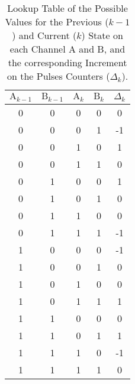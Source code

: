 \begin{table}[t!]

\centering
\caption{Lookup Table of the Possible Values for the Previous ($k-1$) and Current ($k$) State on each Channel A and B, and the corresponding Increment on the Pulses Counters ($\Delta_k$).}
\label{tab:fw:encoders}



\begin{tabular}{c c | c c | c}

\hline
\textbf{$\text{A}_{k-1}$} &
\textbf{$\text{B}_{k-1}$} &
\textbf{$\text{A}_{k}$} &
\textbf{$\text{B}_{k}$} &
\textbf{$\Delta_{k}$}\\
\hline



0 & 0 & 0 & 0 &  0\\ %
0 & 0 & 0 & 1 & -1\\
0 & 0 & 1 & 0 &  1\\
0 & 0 & 1 & 1 &  0\\ %
\hline
0 & 1 & 0 & 0 &  1\\
0 & 1 & 0 & 1 &  0\\ %
0 & 1 & 1 & 0 &  0\\ %
0 & 1 & 1 & 1 & -1\\
\hline
1 & 0 & 0 & 0 & -1\\
1 & 0 & 0 & 1 &  0\\ %
1 & 0 & 1 & 0 &  0\\ %
1 & 0 & 1 & 1 &  1\\
\hline
1 & 1 & 0 & 0 &  0\\ %
1 & 1 & 0 & 1 &  1\\
1 & 1 & 1 & 0 & -1\\
1 & 1 & 1 & 1 &  0\\ %
\hline



\end{tabular}



\end{table}
